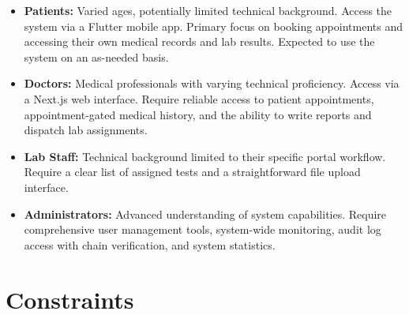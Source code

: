 \documentclass[a4paper,12pt]{report}
\begin{document}
\begin{itemize}
    \item \textbf{Patients:} Varied ages, potentially limited technical background. Access the system via a Flutter mobile app. Primary focus on booking appointments and accessing their own medical records and lab results. Expected to use the system on an as-needed basis.
    \item \textbf{Doctors:} Medical professionals with varying technical proficiency. Access via a Next.js web interface. Require reliable access to patient appointments, appointment-gated medical history, and the ability to write reports and dispatch lab assignments.
    \item \textbf{Lab Staff:} Technical background limited to their specific portal workflow. Require a clear list of assigned tests and a straightforward file upload interface.
    \item \textbf{Administrators:} Advanced understanding of system capabilities. Require comprehensive user management tools, system-wide monitoring, audit log access with chain verification, and system statistics.
\end{itemize}

\section{Constraints}
\end{document}
